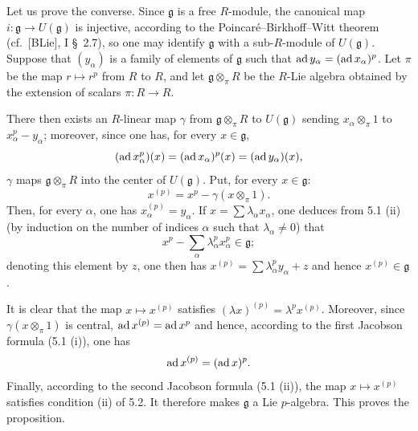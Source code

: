 Let us prove the converse. Since $\mathfrak g$ is a free $R$-module, the canonical map $i:\mathfrak g\to U(\mathfrak g)$ is injective, according to the Poincar\'e--Birkhoff--Witt theorem (cf.\ [BLie], I \S~2.7), so one may identify $\mathfrak g$ with a sub-$R$-module of $U(\mathfrak g)$. Suppose that $(y_\alpha)$ is a family of elements of $\mathfrak g$ such that $\operatorname{ad} y_\alpha=(\operatorname{ad} x_\alpha)^p$. Let $\pi$ be the map $r\mapsto r^p$ from $R$ to $R$, and let $\mathfrak g\otimes_\pi R$ be the $R$-Lie algebra obtained by the extension of scalars $\pi:R\to R$.

There then exists an $R$-linear map $\gamma$ from $\mathfrak g\otimes_\pi R$ to $U(\mathfrak g)$ sending $x_\alpha\otimes_\pi1$ to $x_\alpha^p-y_\alpha$; moreover, since one has, for every $x\in\mathfrak g$,
\[
(\operatorname{ad} x_\alpha^p)(x)=(\operatorname{ad} x_\alpha)^p(x)=(\operatorname{ad} y_\alpha)(x),
\]
$\gamma$ maps $\mathfrak g\otimes_\pi R$ into the center of $U(\mathfrak g)$. Put, for every $x\in\mathfrak g$:
\[
x^{(p)}=x^p-\gamma(x\otimes_\pi1).
\]
Then, for every $\alpha$, one has $x_\alpha^{(p)}=y_\alpha$. If $x=\sum\lambda_\alpha x_\alpha$, one deduces from 5.1 (ii) (by induction on the number of indices $\alpha$ such that $\lambda_\alpha\ne0$) that
\[
x^p-\sum_\alpha\lambda_\alpha^p x_\alpha^p\in\mathfrak g;
\]
denoting this element by $z$, one then has $x^{(p)}=\sum\lambda_\alpha^py_\alpha+z$ and hence $x^{(p)}\in\mathfrak g$.

It is clear that the map $x\mapsto x^{(p)}$ satisfies $(\lambda x)^{(p)}=\lambda^px^{(p)}$. Moreover, since $\gamma(x\otimes_\pi1)$ is central, $\operatorname{ad} x^{(p)}=\operatorname{ad} x^p$ and hence, according to the first Jacobson formula (5.1 (i)), one has
\[
\operatorname{ad} x^{(p)}=(\operatorname{ad} x)^p.
\]
Finally, according to the second Jacobson formula (5.1 (ii)), the map $x\mapsto x^{(p)}$ satisfies condition (ii) of 5.2. It therefore makes $\mathfrak g$ a Lie $p$-algebra. This proves the proposition.

